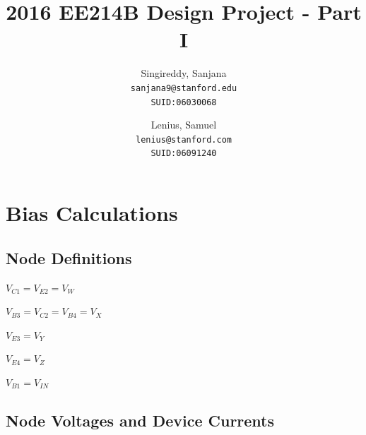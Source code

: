 \documentclass[12pt,a4paper]{article}
\begin{document}




\author{
  Singireddy, Sanjana\\
  \texttt{sanjana9@stanford.edu}\\
  \texttt{SUID:06030068}
  \and
  Lenius, Samuel\\
  \texttt{lenius@stanford.com}\\
  \texttt{SUID:06091240}
}

\title{2016 EE214B Design Project - Part I}

\maketitle

\pagebreak



\section{Bias Calculations}


\subsection{Node Definitions}
\begin{flushleft}

$V_{C1} = V_{E2} = V_{W}$

$V_{B3} = V_{C2} = V_{B4} = V_{X}$

$V_{E3} = V_{Y}$

$V_{E4} = V_{Z}$

$V_{B1} = V_{IN}$

\end{flushleft}

\subsection{Node Voltages and Device Currents}
\end{document}
